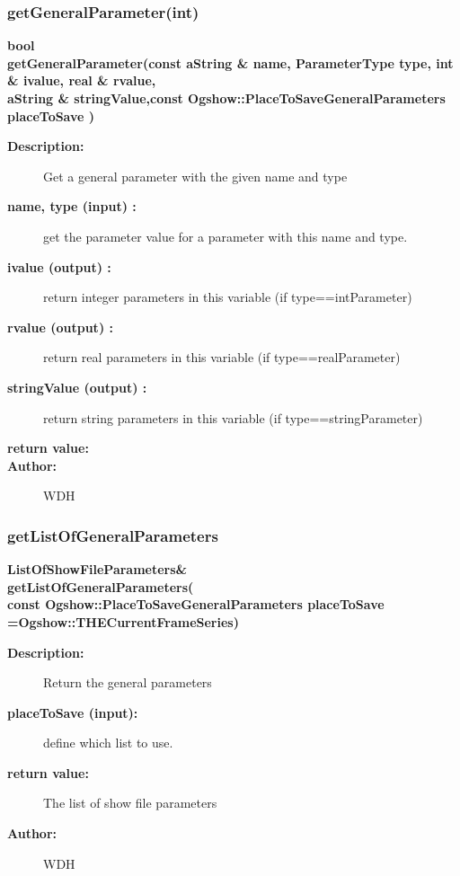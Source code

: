\subsubsection{getGeneralParameter(int)}
 
\begin{flushleft} \textbf{%
bool  \\ 
\settowidth{\ShowFileReaderIncludeArgIndent}{getGeneralParameter(}%
getGeneralParameter(const aString \& name,  ParameterType type, int \& ivalue, real \& rvalue, \\ 
\hspace{\ShowFileReaderIncludeArgIndent}aString \& stringValue,const Ogshow::PlaceToSaveGeneralParameters placeToSave ) 
}\end{flushleft}
\begin{description}
\item[{\bf Description:}] 
    Get a general parameter with the given name and type
\item[{\bf name, type (input) :}]  get the parameter value for a parameter with this name and type.
\item[{\bf ivalue (output) :}]  return integer parameters in this variable (if type==intParameter)
\item[{\bf rvalue (output) :}]  return real parameters in this variable (if type==realParameter)
\item[{\bf stringValue (output) :}]  return string parameters in this variable (if type==stringParameter)
\item[{\bf return value:}]  
\item[{\bf Author:}]  WDH
\end{description}
\subsubsection{getListOfGeneralParameters}
 
\begin{flushleft} \textbf{%
ListOfShowFileParameters\&  \\ 
\settowidth{\ShowFileReaderIncludeArgIndent}{ getListOfGeneralParameters(}%
getListOfGeneralParameters( \\ 
\hspace{\ShowFileReaderIncludeArgIndent}const Ogshow::PlaceToSaveGeneralParameters placeToSave  =Ogshow::THECurrentFrameSeries)
}\end{flushleft}
\begin{description}
\item[{\bf Description:}] 
 Return the general parameters
 
\item[{\bf placeToSave (input):}]  define which list to use.
 
\item[{\bf return value:}]  The list of show file parameters
\item[{\bf Author:}]  WDH
\end{description}
